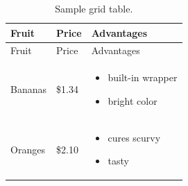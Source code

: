 \documentclass[]{article}
\providecommand{\tightlist}{%
  \setlength{\itemsep}{0pt}\setlength{\parskip}{0pt}}
\begin{document}
\begin{longtable}[]{@{}lll@{}}
\caption{Sample grid table.}\tabularnewline
\toprule
\begin{minipage}[b]{0.20\columnwidth}\raggedright\strut
Fruit
\strut\end{minipage} &
\begin{minipage}[b]{0.20\columnwidth}\raggedright\strut
Price
\strut\end{minipage} &
\begin{minipage}[b]{0.27\columnwidth}\raggedright\strut
Advantages
\strut\end{minipage}\tabularnewline
\midrule
\endfirsthead
\toprule
\begin{minipage}[b]{0.20\columnwidth}\raggedright\strut
Fruit
\strut\end{minipage} &
\begin{minipage}[b]{0.20\columnwidth}\raggedright\strut
Price
\strut\end{minipage} &
\begin{minipage}[b]{0.27\columnwidth}\raggedright\strut
Advantages
\strut\end{minipage}\tabularnewline
\midrule
\endhead
\begin{minipage}[t]{0.20\columnwidth}\raggedright\strut
Bananas
\strut\end{minipage} &
\begin{minipage}[t]{0.20\columnwidth}\raggedright\strut
\$1.34
\strut\end{minipage} &
\begin{minipage}[t]{0.27\columnwidth}\raggedright\strut
\begin{itemize}
\tightlist
\item
  built-in wrapper
\item
  bright color
\end{itemize}
\strut\end{minipage}\tabularnewline
\begin{minipage}[t]{0.20\columnwidth}\raggedright\strut
Oranges
\strut\end{minipage} &
\begin{minipage}[t]{0.20\columnwidth}\raggedright\strut
\$2.10
\strut\end{minipage} &
\begin{minipage}[t]{0.27\columnwidth}\raggedright\strut
\begin{itemize}
\tightlist
\item
  cures scurvy
\item
  tasty
\end{itemize}
\strut\end{minipage}\tabularnewline
\bottomrule
\end{longtable}
\end{document}
